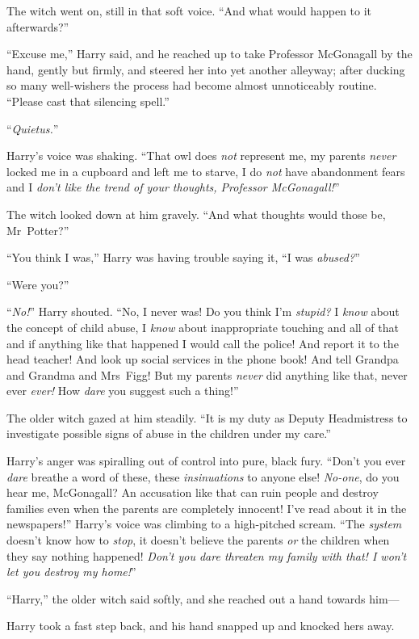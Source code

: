 The witch went on, still in that soft voice. “And what would happen to it afterwards?”

“Excuse me,” Harry said, and he reached up to take Professor McGonagall by the hand, gently but firmly, and steered her into yet another alleyway; after ducking so many well-wishers the process had become almost unnoticeably routine. “Please cast that silencing spell.”

“\emph{Quietus.}”

Harry’s voice was shaking. “That owl does \emph{not} represent me, my parents \emph{never} locked me in a cupboard and left me to starve, I do \emph{not} have abandonment fears and I \emph{don’t like the trend of your thoughts, Professor McGonagall!}”

The witch looked down at him gravely. “And what thoughts would those be, Mr~Potter?”

“You think I was,” Harry was having trouble saying it, “I was \emph{abused?}”

“Were you?”

“\emph{No!}” Harry shouted. “No, I never was! Do you think I’m \emph{stupid?} I \emph{know} about the concept of child abuse, I \emph{know} about inappropriate touching and all of that and if anything like that happened I would call the police! And report it to the head teacher! And look up social services in the phone book! And tell Grandpa and Grandma and Mrs~Figg! But my parents \emph{never} did anything like that, never ever \emph{ever!} How \emph{dare} you suggest such a thing!”

The older witch gazed at him steadily. “It is my duty as Deputy Headmistress to investigate possible signs of abuse in the children under my care.”

Harry’s anger was spiralling out of control into pure, black fury. “Don’t you ever \emph{dare} breathe a word of these, these \emph{insinuations} to anyone else! \emph{No-one}, do you hear me, McGonagall? An accusation like that can ruin people and destroy families even when the parents are completely innocent! I’ve read about it in the newspapers!” Harry’s voice was climbing to a high-pitched scream. “The \emph{system} doesn’t know how to \emph{stop}, it doesn’t believe the parents \emph{or} the children when they say nothing happened! \emph{Don’t you dare threaten my family with that! I won’t let you destroy my home!}”

“Harry,” the older witch said softly, and she reached out a hand towards him—

Harry took a fast step back, and his hand snapped up and knocked hers away.

